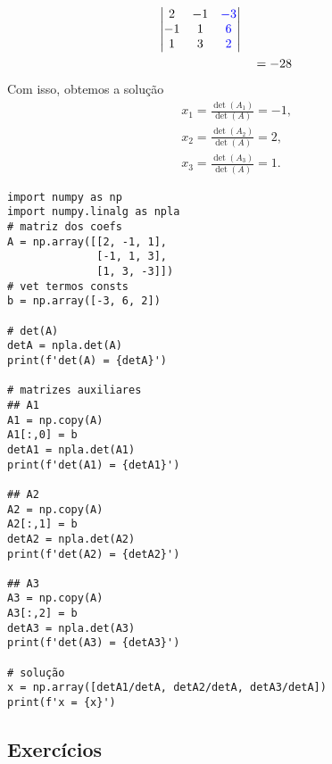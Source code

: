 \begin{ex}
\begin{align}
\begin{vmatrix}
                2 & -1 & {\color{blue}-3}\\
                -1 & 1 & {\color{blue}6}\\
                1 & 3 & {\color{blue}2}
              \end{vmatrix}\\
    & \text{}\quad = -28
  \end{align}
  Com isso, obtemos a solução
  \begin{align}
    & x_1 = \frac{\det(A_1)}{\det(A)} = -1, \\
    & x_2 = \frac{\det(A_2)}{\det(A)} = 2, \\
    & x_3 = \frac{\det(A_3)}{\det(A)} = 1.
  \end{align}

\begin{lstlisting}
import numpy as np
import numpy.linalg as npla
# matriz dos coefs
A = np.array([[2, -1, 1],
              [-1, 1, 3],
              [1, 3, -3]])
# vet termos consts
b = np.array([-3, 6, 2])

# det(A)
detA = npla.det(A)
print(f'det(A) = {detA}')

# matrizes auxiliares
## A1
A1 = np.copy(A)
A1[:,0] = b
detA1 = npla.det(A1)
print(f'det(A1) = {detA1}')

## A2
A2 = np.copy(A)
A2[:,1] = b
detA2 = npla.det(A2)
print(f'det(A2) = {detA2}')

## A3
A3 = np.copy(A)
A3[:,2] = b
detA3 = npla.det(A3)
print(f'det(A3) = {detA3}')

# solução
x = np.array([detA1/detA, detA2/detA, detA3/detA])
print(f'x = {x}')
\end{lstlisting}

\end{ex}


\subsection{Exercícios}


